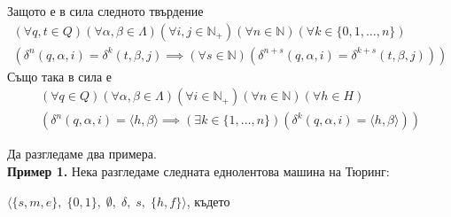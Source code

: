 \documentclass[14pt]{extarticle}
\begin{document}
Защото е в сила следното твърдение
\begin{align*}
    (\forall q, t \in Q)(\forall \alpha, \beta \in \Lambda)(\forall i, j \in \mathbb{N}_+)(\forall n \in \mathbb N)(\forall k \in \{0, 1, \dots, n\})\\(
        \delta^n(q, \alpha, i) = \delta^k(t, \beta, j) \implies (\forall s \in \mathbb N)(\delta^{n + s}(q, \alpha, i) = \delta^{k + s}(t, \beta, j))
    )
\end{align*}
Също така в сила е
\begin{align*}
    (\forall q \in Q)(\forall \alpha, \beta \in \Lambda)(\forall i \in \mathbb{N}_+)(\forall n \in \mathbb N)(\forall h \in H)\\(
        \delta^n(q, \alpha, i) = \langle h, \beta \rangle \implies (\exists k \in \{1, \dots, n\})(\delta^k(q, \alpha, i) = \langle h, \beta \rangle)
    )
\end{align*}

Да разгледаме два примера. \\

\textbf{Пример 1.} Нека разгледаме следната еднолентова машина на Тюринг:

\(\langle \{s, m, e\},\; \{0, 1\},\; \emptyset,\; \delta,\; s,\; \{h, f\} \rangle\), където
\end{document}
